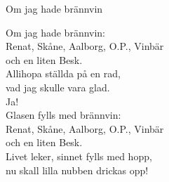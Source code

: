 \begin{song}{Om jag hade brännvin}
	
	
		
	Om jag hade brännvin:\\
	Renat, Skåne, Aalborg, O.P., Vinbär\\
	och en liten Besk.\\
	Allihopa ställda på en rad,\\
	vad jag skulle vara glad.\\
	Ja!\\
	Glasen fylls med brännvin:\\
	Renat, Skåne, Aalborg, O.P., Vinbär\\
	och en liten Besk.\\
	Livet leker, sinnet fylls med hopp,\\
	nu skall lilla nubben drickas opp!
	
\end{song}
